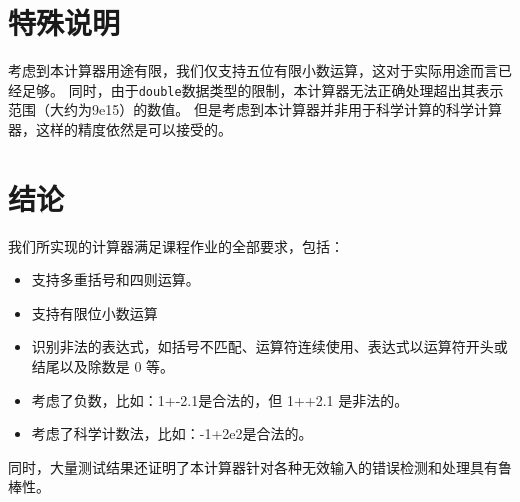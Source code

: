 \documentclass[UTF8]{ctexart}
\begin{document}
\section{特殊说明}
考虑到本计算器用途有限，我们仅支持五位有限小数运算，这对于实际用途而言已经足够。
同时，由于\texttt{double}数据类型的限制，本计算器无法正确处理超出其表示范围（大约为9e15）的数值。
但是考虑到本计算器并非用于科学计算的科学计算器，这样的精度依然是可以接受的。
\section{结论}
我们所实现的计算器满足课程作业的全部要求，包括：
\begin{itemize}
    \item 支持多重括号和四则运算。
    \item 支持有限位小数运算
    \item 识别非法的表达式，如括号不匹配、运算符连续使用、表达式以运算符开头或结尾以及除数是 0 等。
    \item 考虑了负数，比如：1+-2.1是合法的，但 1++2.1 是非法的。
    \item 考虑了科学计数法，比如：-1+2e2是合法的。
\end{itemize}
同时，大量测试结果还证明了本计算器针对各种无效输入的错误检测和处理具有鲁棒性。
\end{document}
